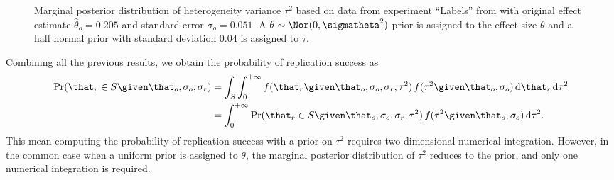\begin{subappendices}
\begin{figure}[!htb]
\begin{knitrout}
\end{knitrout}
\caption{Marginal posterior distribution of heterogeneity variance $\tau^{2}$
  based on data from experiment ``Labels'' from \citet{Protzko2020} with
  original effect estimate $\hat{\theta}_{o} = 0.205$ and
  standard error $\sigma_{o} = 0.051$. A
  $\theta \sim \Nor(0, \sigmatheta^{2})$ prior is assigned to the
  effect size $\theta$ and a half normal prior with standard deviation
  $0.04$ is assigned to $\tau$.}
\label{fig:margposttau2}
\end{figure}

Combining all the previous results, we obtain the probability of replication
success as
\begin{align*}
  \Pr(\that_{r} \in S \given \that_{o}, \sigma_{o}, \sigma_{r})
  &= \int_{S}\int_{0}^{+\infty} f(\that_{r} \given \that_{o}, \sigma_{o}, \sigma_{r}, \tau^{2}) \,
    f(\tau^{2} \given \that_{o}, \sigma_{o}) \, \text{d}\that_{r} \,\text{d}\tau^{2} \\
  &= \int_{0}^{+\infty} \Pr(\that_{r} \in S \given \that_{o}, \sigma_{o}, \sigma_{r}, \tau^{2}) \,
    f(\tau^{2} \given \that_{o}, \sigma_{o}) \, \text{d}\tau^{2}. \\
\end{align*}
This mean computing the probability of replication success with a prior on
$\tau^{2}$ requires two-dimensional numerical integration. However, in the
common case when a uniform prior is assigned to $\theta$, the marginal posterior
distribution of $\tau^{2}$ reduces to the prior, and only one numerical
integration is required.


\end{subappendices}

